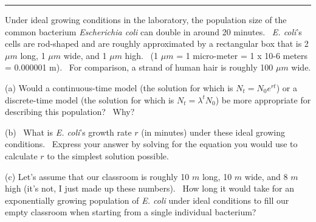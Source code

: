 \documentclass{article}
\begin{document}
\noindent{}

\rule[0.5ex]{\linewidth}{1pt}

Under ideal growing conditions in the laboratory, the population size of the common bacterium \emph{Escherichia coli} can double in around 20 minutes.  \emph{E. coli}'s cells are rod-shaped and are roughly approximated by a rectangular box that is 2 $\mu m$ long, 1 $\mu m$ wide, and 1 $\mu m$ high.  (1 $\mu m$ = 1 micro-meter = 1 x 10-6 meters = 0.000001 m).  For comparison, a strand of human hair is roughly 100 $\mu m$ wide.

\vspace{1cm}

(a) Would a continuous-time model (the solution for which is $N_t=N_0 e^{rt}$) or a discrete-time model (the solution for which is $N_t = \lambda^t N_0$) be more appropriate for describing this population?  Why?

\vspace{3cm}


\vspace{1cm}

(b)  What is \emph{E. coli}'s growth rate $r$ (in minutes) under these ideal growing conditions.  Express your answer by solving for the equation you would use to calculate $r$ to the simplest solution possible.

\vspace{4cm}

\vspace{1cm}

(c) Let's assume that our classroom is roughly 10 $m$ long, 10 $m$ wide, and 8 $m$ high (it’s not, I just made up these numbers).  How long it would take for an exponentially growing population of \emph{E. coli} under ideal conditions to fill our empty classroom when starting from a single individual bacterium?

\vspace{1cm}
\end{document}
